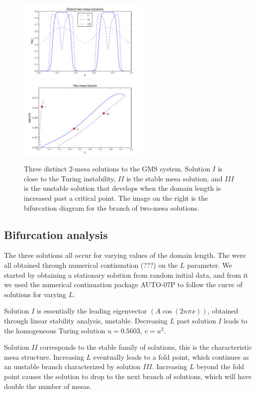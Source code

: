 \documentclass[a4paper,10pt]{article}
\begin{document}
% 
\begin{figure}[htb]
\begin{center}
\includegraphics[width=2.5in]{typical_solutions}\includegraphics[width=2.5in]{two_mesa_branch}

\caption{Three distinct 2-mesa solutions to the GMS system. Solution $I$ is close to the Turing instability, $II$ is the stable mesa solution, and $III$ is the unstable solution that develops when the domain length is increased past a critical point. The image on the right is the bifurcation diagram for the branch of two-mesa solutions.}
\label{fig:typical}
\end{center}
\end{figure}
% 

\subsection{Bifurcation analysis}

The three solutions all occur for varying values of the domain length. The were all obtained through numerical continuation (???) on the $L$ parameter. We started by obtaining a stationary solution from random initial data, and from it we used the numerical continuation package AUTO-07P to follow the curve of solutions for varying $L$. 

Solution $I$ is essentially the leading eigenvector $(A\cos(2n\pi x))$, obtained through linear stability analysis, unstable. Decreasing $L$ past solution $I$ leads to the homogeneous Turing solution $u=0.5603$, $v=u^2$.

Solution $II$ corresponds to the stable family of solutions, this is the characteristic mesa structure. Increasing $L$ eventually leads to a fold point, which continues as an unstable branch characterized by solution $III$. Increasing $L$ beyond the fold point causes the solution to drop to the next branch of solutions, which will have double the number of mesas.
\end{document}
